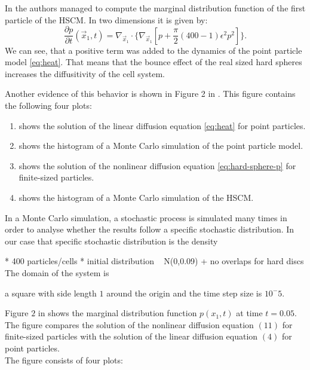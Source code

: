 In \cite{Bruna2012} the authors managed to compute the marginal distribution function of the first particle of the HSCM. 
In two dimensions it is given by:
\begin{equation}
    \frac{\partial p}{\partial t}(\vec{x}_1, t) = \nabla_{\vec{x}_1} \cdot \{\nabla_{\vec{x}_1}[p + \frac{\pi}{2}(400 - 1)\epsilon^2 p^2]\}.
    \label{eq:hard-sphere-p}
\end{equation}
We can see, that a positive term was added to the dynamics of the point particle model \ref{eq:heat}. 
That means that the bounce effect of the real sized hard spheres increases the diffusitivity of the cell system. 

Another evidence of this behavior is shown in Figure 2 in \cite{Bruna2012}. 
This figure contains the following four plots:
\begin{enumerate}[label=(\alph*)]
    \item shows the solution of the linear diffusion equation \ref{eq:heat} for point particles.
    \item shows the histogram of a Monte Carlo simulation of the point particle model.
    \item shows the solution of the nonlinear diffusion equation \ref{eq:hard-sphere-p} for finite-sized particles.
    \item shows the histogram of a Monte Carlo simulation of the HSCM. 
\end{enumerate} 
In a Monte Carlo simulation, a stochastic process is simulated many times in order to analyse whether the results follow a specific stochastic distribution.
In our case that specific stochastic distribution is the density 

* 400 particles/cells 
* initial distribution ~ N(0,0.09) + no overlaps for hard discs 
The domain of the system is 

a square with side length $1$ around the origin
and the time step size is $10^-5$. 

Figure $2$ in \cite{Bruna2012} shows the marginal distribution function $p(x_1, t)$ at time $t = 0.05$. 
The figure compares the solution of the nonlinear diffusion equation $(11)$ for finite-sized particles with the solution of the linear diffusion equation $(4)$ for point particles. \\
The figure consists of four plots:

